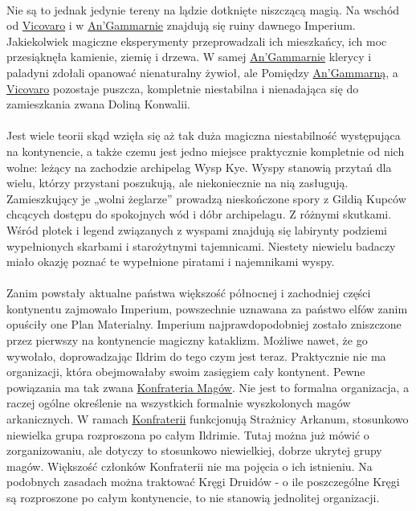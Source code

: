 \documentclass[10pt,twoside,twocolumn]{book}
\begin{document}
\paragraph{}
Nie są to jednak jedynie tereny na lądzie dotknięte niszczącą magią.
Na wschód od \hyperref[Vicovaro]{Vicovaro} i w \hyperref[AnGammarna]{An’Gammarnie} znajdują się ruiny dawnego Imperium.
Jakiekolwiek magiczne eksperymenty przeprowadzali ich mieszkańcy, ich moc przesiąknęła kamienie, ziemię i drzewa.
W samej \hyperref[AnGammarna]{An’Gammarnie} klerycy i paladyni zdołali opanować nienaturalny żywioł, ale Pomiędzy \hyperref[AnGammarna]{An’Gammarną}, a \hyperref[Vicovaro]{Vicovaro} pozostaje puszcza, kompletnie niestabilna i nienadająca się do zamieszkania zwana Doliną Konwalii.

\paragraph{}
Jest wiele teorii skąd wzięła się aż tak duża magiczna niestabilność występująca na kontynencie, a także czemu jest jedno miejsce praktycznie kompletnie od nich wolne: leżący na zachodzie archipelag Wysp Kye.
Wyspy stanowią przytań dla wielu, którzy przystani poszukują, ale niekoniecznie na nią zasługują.
Zamieszkujący je „wolni żeglarze” prowadzą nieskończone spory z Gildią Kupców chcących dostępu do spokojnych wód i dóbr archipelagu.
Z różnymi skutkami.
Wśród plotek i legend związanych z wyspami znajdują się labirynty podziemi wypełnionych skarbami i starożytnymi tajemnicami.
Niestety niewielu badaczy miało okazję poznać te wypełnione piratami i najemnikami wyspy.

\paragraph{}
Zanim powstały aktualne państwa większość północnej i zachodniej części kontynentu zajmowało Imperium, powszechnie uznawana za państwo elfów zanim opuściły one Plan Materialny.
Imperium najprawdopodobniej zostało zniszczone przez pierwszy na kontynencie magiczny kataklizm.
Możliwe nawet, że go wywołało, doprowadzając Ildrim do tego czym jest teraz.
Praktycznie nie ma organizacji, która obejmowałaby swoim zasięgiem cały kontynent.
Pewne powiązania ma tak zwana \hyperref[KonfrateriaMagow]{Konfrateria Magów}.
Nie jest to formalna organizacja, a raczej ogólne określenie na wszystkich formalnie wyszkolonych magów arkanicznych.
W ramach \hyperref[KonfrateriaMagow]{Konfraterii} funkcjonują Strażnicy Arkanum, stosunkowo niewielka grupa rozproszona po całym Ildrimie.
Tutaj można już mówić o zorganizowaniu, ale dotyczy to stosunkowo niewielkiej, dobrze ukrytej grupy magów.
Większość członków Konfraterii nie ma pojęcia o ich istnieniu.
Na podobnych zasadach można traktować Kręgi Druidów -  o ile poszczególne Kręgi są rozproszone po całym kontynencie, to nie stanowią jednolitej organizacji.
\end{document}
